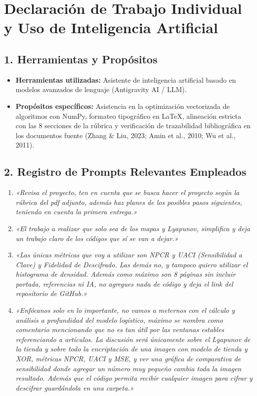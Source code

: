 \documentclass[11pt,letterpaper]{article}
\begin{document}
\newpage
\section*{Declaración de Trabajo Individual y Uso de Inteligencia Artificial}

\subsection*{1. Herramientas y Propósitos}
\begin{itemize}
    \item \textbf{Herramientas utilizadas:} Asistente de inteligencia artificial basado en modelos avanzados de lenguaje (Antigravity AI / LLM).
    \item \textbf{Propósitos específicos:} Asistencia en la optimización vectorizada de algoritmos con NumPy, formateo tipográfico en \LaTeX, alineación estricta con las 8 secciones de la rúbrica y verificación de trazabilidad bibliográfica en los documentos fuente (Zhang \& Liu, 2023; Amin et al., 2010; Wu et al., 2011).
\end{itemize}

\subsection*{2. Registro de Prompts Relevantes Empleados}
\begin{enumerate}
    \item \textit{«Revisa el proyecto, ten en cuenta que se busca hacer el proyecto según la rúbrica del pdf adjunto, además haz planes de los posibles pasos siguientes, teniendo en cuenta la primera entrega.»}
    \item \textit{«El trabajo a realizar que solo sea de los mapas y Lyapunov, simplifica y deja un trabajo claro de los códigos que sí se van a dejar.»}
    \item \textit{«Las únicas métricas que voy a utilizar son NPCR y UACI (Sensibilidad a Clave) y Fidelidad de Descifrado. Las demás no, y tampoco quiero utilizar el histograma de densidad. Además como máximo son 8 páginas sin incluir portada, referencias ni IA, no agregues nada de código y deja el link del repositorio de GitHub.»}
    \item \textit{«Enfócanos solo en lo importante, no vamos a meternos con el cálculo y análisis a profundidad del modelo logístico, máximo se nombra como comentario mencionando que no es tan útil por las ventanas estables referenciando a artículos. La discusión será únicamente sobre el Lyapunov de la tienda y sobre todo la encriptación de una imagen con modelo de tienda y XOR, métricas NPCR, UACI y MSE, y ver una gráfica de comparativa de sensibilidad donde agregar un número muy pequeño cambia toda la imagen resultado. Además que el código permita recibir cualquier imagen para cifrar y descifrar guardándola en una carpeta.»}
\end{enumerate}
\end{document}

